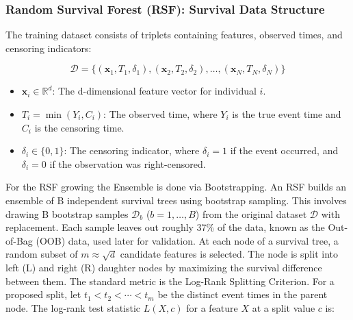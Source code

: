 \documentclass[10pt]{NSP1}
\begin{document}
\subsubsection{Random Survival Forest (RSF): Survival Data Structure}

The training dataset consists of triplets containing features, observed times, and censoring indicators:

\begin{equation}
\mathcal{D} = \{(\mathbf{x}_1, T_1, \delta_1), (\mathbf{x}_2, T_2, \delta_2), \dots, (\mathbf{x}_N, T_N, \delta_N)\}
\end{equation}

\begin{itemize}
    \item $\mathbf{x}_i \in \mathbb{R}^d$: The d-dimensional feature vector for individual $i$.
    \item $T_i = \min(Y_i, C_i)$: The observed time, where $Y_i$ is the true event time and $C_i$ is the censoring time.
    \item $\delta_i \in \{0, 1\}$: The censoring indicator, where $\delta_i = 1$ if the event occurred, and $\delta_i = 0$ if the observation was right-censored.
\end{itemize}


For the RSF growing the Ensemble is done via Bootstrapping. An RSF builds an ensemble of B independent survival trees using bootstrap sampling. This involves drawing B bootstrap samples $\mathcal{D}_b$ ($b = 1, \dots, B$) from the original dataset $\mathcal{D}$ with replacement. Each sample leaves out roughly 37\% of the data, known as the Out-of-Bag (OOB) data, used later for validation. At each node of a survival tree, a random subset of $m \approx \sqrt{d}$ candidate features is selected. The node is split into left (L) and right (R) daughter nodes by maximizing the survival difference between them. The standard metric is the Log-Rank Splitting Criterion. For a proposed split, let $t_1 < t_2 < \cdots < t_m$ be the distinct event times in the parent node. The log-rank test statistic $L(X, c)$ for a feature $X$ at a split value $c$ is: 
\end{document}
